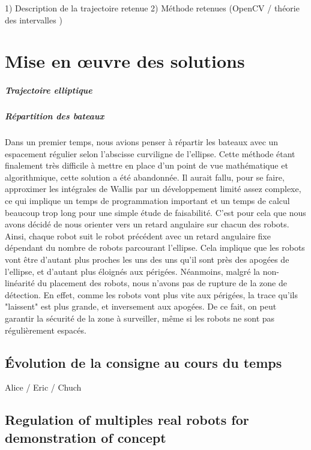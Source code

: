 \documentclass[10pt,a4paper]{report}
\begin{document}
1) Description de la trajectoire retenue
2) Méthode retenues (OpenCV / théorie des intervalles )


\chapter{Mise en œuvre des solutions}

\paragraph{Trajectoire elliptique}

\paragraph{Répartition des bateaux}
Dans un premier temps, nous avions penser à répartir les bateaux avec un espacement régulier selon l'abscisse curviligne de l'ellipse.
Cette méthode étant finalement très difficile à mettre en place d'un point de vue mathématique et algorithmique, cette solution a été abandonnée. Il aurait fallu, pour se faire, approximer les intégrales de Wallis par un développement limité assez complexe, ce qui implique un temps de programmation important et un temps de calcul beaucoup trop long pour une simple étude de faisabilité.
C'est pour cela que nous avons décidé de nous orienter vers un retard angulaire sur chacun des robots. Ainsi, chaque robot suit le robot précédent avec un retard angulaire fixe dépendant du nombre de robots parcourant l'ellipse. Cela implique que les robots vont être d'autant plus proches les uns des uns qu'il sont près des apogées de l'ellipse, et d'autant plus éloignés aux périgées.
Néanmoins, malgré la non-linéarité du placement des robots, nous n'avons pas de rupture de la zone de détection. En effet, comme les robots vont plus vite aux périgées, la trace qu'ils "laissent" est plus grande, et inversement aux apogées. De ce fait, on peut garantir la sécurité de la zone à surveiller, même si les robots ne sont pas régulièrement espacés.


\section{Évolution de la consigne au cours du temps}

Alice / Eric / Chuch

\section{Regulation of multiples real robots for demonstration of concept}
\end{document}
